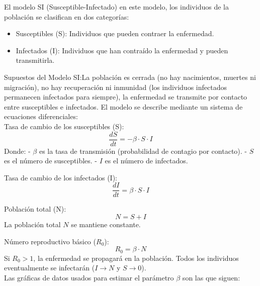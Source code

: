 El modelo SI (Susceptible-Infectado) en este modelo, los individuos de la población se clasifican en dos categorías:
\begin{itemize}
    \item Susceptibles (S): Individuos que pueden contraer la enfermedad.
    \item  Infectados (I): Individuos que han contraído la enfermedad y pueden transmitirla.    
\end{itemize}

Supuestos del Modelo SI:La población es cerrada (no hay nacimientos, muertes ni migración), no hay recuperación ni inmunidad (los individuos infectados permanecen 
infectados para siempre), la enfermedad se transmite por contacto entre susceptibles e infectados. El modelo se describe mediante un sistema de ecuaciones diferenciales: \\

Tasa de cambio de los susceptibles (S): \\
   \[
   \frac{dS}{dt} = -\beta \cdot S \cdot I
   \]
   Donde:
   - \( \beta \) es la tasa de transmisión (probabilidad de contagio por contacto).
   - \( S \) es el número de susceptibles.
   - \( I \) es el número de infectados.

Tasa de cambio de los infectados (I):\\
   \[
   \frac{dI}{dt} = \beta \cdot S \cdot I
   \]

Población total (N): \\
   \[
   N = S + I
   \]
   La población total \( N \) se mantiene constante.

Número reproductivo básico (\( R_0 \)):
   \[
   R_0 = \beta \cdot N
   \]
   Si \( R_0 > 1 \), la enfermedad se propagará en la población. Todos los individuos eventualmente se infectarán (\( I \to N \) y \( S \to 0 \)). \\

   Las gráficas de datos usados para estimar el parámetro $\beta$ son las que siguen:



